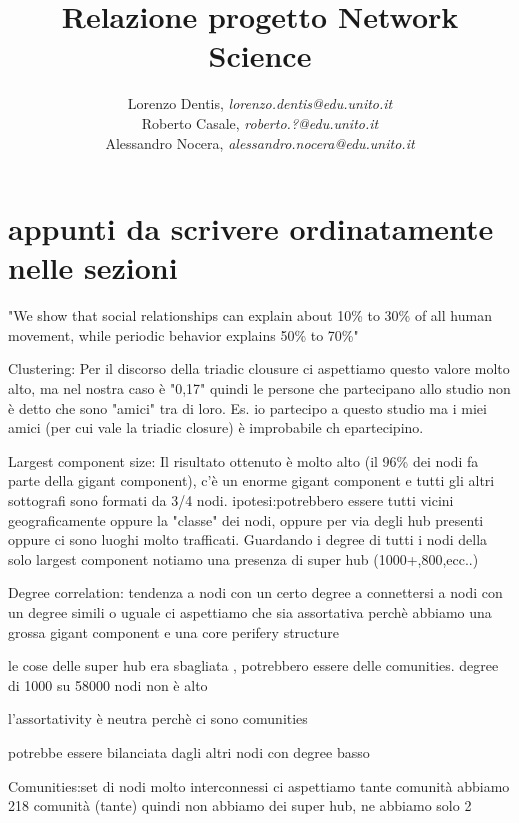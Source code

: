 \documentclass[a4paper]{article}
\begin{document}
\author{
	Lorenzo Dentis, \textit{lorenzo.dentis@edu.unito.it}\\
	Roberto Casale, \textit{roberto.?@edu.unito.it}\\
	Alessandro Nocera, \textit{alessandro.nocera@edu.unito.it}
}
\title{Relazione progetto Network Science}
\maketitle

\tableofcontents

\section{appunti da scrivere ordinatamente nelle sezioni}
"We show that social relationships can explain about 10\% to 30\% of all human movement, while periodic behavior explains 50\% to 70\%"

Clustering: Per il discorso della triadic clousure ci aspettiamo questo valore molto alto, ma nel nostra caso è "0,17" quindi le persone che partecipano allo studio non è detto che sono "amici" tra di loro.
Es. io partecipo a questo studio ma i miei amici (per cui vale la triadic closure) è improbabile ch epartecipino.

Largest component size: Il risultato ottenuto è molto alto (il 96\% dei nodi fa parte della gigant component), c'è un enorme gigant component e tutti gli altri sottografi sono formati da 3/4 nodi. ipotesi:potrebbero essere tutti vicini geograficamente oppure la "classe" dei nodi, oppure per via degli hub presenti oppure ci sono luoghi molto trafficati.
Guardando i degree di tutti i nodi della solo largest component notiamo una presenza di super hub (1000+,800,ecc..)

Degree correlation: tendenza a nodi con un certo degree a connettersi a nodi con un degree simili o uguale
ci aspettiamo che sia assortativa perchè abbiamo una grossa gigant component e una core perifery structure

le cose delle super hub era sbagliata , potrebbero essere delle comunities. degree di 1000 su 58000 nodi non è alto

l'assortativity è neutra perchè ci sono comunities


potrebbe essere bilanciata dagli altri nodi con degree basso


Comunities:set di nodi molto interconnessi
ci aspettiamo tante comunità
abbiamo 218 comunità (tante) quindi non abbiamo dei super hub, ne abbiamo solo 2
\end{document}
